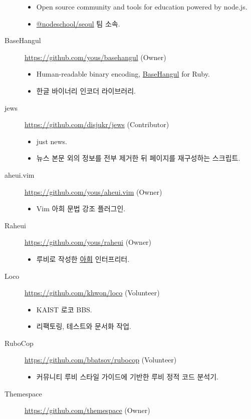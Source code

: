 \documentclass[a4paper,10pt]{article}
\begin{document}
\begin{description}
\begin{itemize}
      \item Open source community and tools for education powered by node.js.
      \item \href{https://github.com/orgs/nodeschool/teams/seoul}{@nodeschool/seoul} 팀 소속.
    \end{itemize}
  \item[BaseHangul] \url{https://github.com/yous/basehangul} (Owner)
    \begin{itemize}
      \item Human-readable binary encoding, \href{https://basehangul.github.io}{BaseHangul} for Ruby.
      \item 한글 바이너리 인코더 라이브러리.
    \end{itemize}
  \item[jews] \url{https://github.com/disjukr/jews} (Contributor)
    \begin{itemize}
      \item just news.
      \item 뉴스 본문 외의 정보를 전부 제거한 뒤 페이지를 재구성하는 스크립트.
    \end{itemize}
  \item[aheui.vim] \url{https://github.com/yous/aheui.vim} (Owner)
    \begin{itemize}
      \item Vim 아희 문법 강조 플러그인.
    \end{itemize}
  \item[Raheui] \url{https://github.com/yous/raheui} (Owner)
    \begin{itemize}
      \item 루비로 작성한 \href{http://aheui.github.io}{아희} 인터프리터.
    \end{itemize}
  \item[Loco] \url{https://github.com/khwon/loco} (Volunteer)
    \begin{itemize}
      \item KAIST 로코 BBS.
      \item 리팩토링, 테스트와 문서화 작업.
    \end{itemize}
  \item[RuboCop] \url{https://github.com/bbatsov/rubocop} (Volunteer)
    \begin{itemize}
      \item 커뮤니티 루비 스타일 가이드에 기반한 루비 정적 코드 분석기.
    \end{itemize}
  \item[Themespace] \url{https://github.com/themespace} (Owner)

\end{description}
\end{document}
